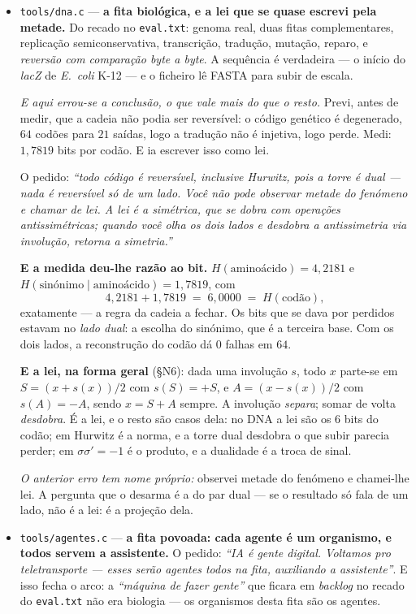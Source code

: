 \documentclass[11pt]{article}
\newcommand{\code}[1]{\texttt{\small #1}}
\theoremstyle{plain}
\theoremstyle{remark}
\begin{document}
\begin{itemize}
\item \code{tools/dna.c} --- \textbf{a fita biológica, e a lei que se quase escrevi pela metade.}
Do recado no \code{eval.txt}: genoma real, duas fitas complementares, replicação semiconservativa,
transcrição, tradução, mutação, reparo, e \emph{reversão com comparação byte a byte}. A sequência é
verdadeira --- o início do \emph{lacZ} de \emph{E.~coli} K-12 --- e o ficheiro lê FASTA para subir de
escala.

\emph{E aqui errou-se a conclusão, o que vale mais do que o resto.} Previ, antes de medir, que a
cadeia não podia ser reversível: o código genético é degenerado, $64$ codões para $21$ saídas, logo a
tradução não é injetiva, logo perde. Medi: $1{,}7819$ bits por codão. E ia escrever isso como lei.

O pedido: \emph{``todo código é reversível, inclusive Hurwitz, pois a torre é dual --- nada é
reversível só de um lado. Você não pode observar metade do fenómeno e chamar de lei. A lei é a
simétrica, que se dobra com operações antissimétricas; quando você olha os dois lados e desdobra a
antissimetria via involução, retorna a simetria.''}

\textbf{E a medida deu-lhe razão ao bit.} $H(\text{aminoácido})=4{,}2181$ e
$H(\text{sinónimo}\mid\text{aminoácido})=1{,}7819$, com
\[
 4{,}2181 + 1{,}7819 \;=\; 6{,}0000 \;=\; H(\text{codão}),
\]
exatamente --- a regra da cadeia a fechar. Os bits que se dava por perdidos estavam no \emph{lado
dual}: a escolha do sinónimo, que é a terceira base. Com os dois lados, a reconstrução do codão dá
$0$ falhas em $64$.

\textbf{E a lei, na forma geral} (§N6): dada uma involução $s$, todo $x$ parte-se em
$S=(x+s(x))/2$ com $s(S)=+S$, e $A=(x-s(x))/2$ com $s(A)=-A$, sendo $x=S+A$ sempre. A involução
\emph{separa}; somar de volta \emph{desdobra}. É a lei, e o resto são casos dela: no DNA a lei são os
$6$ bits do codão; em Hurwitz é a norma, e a torre dual desdobra o que subir parecia perder; em
$\sigma\sigma'=-1$ é o produto, e a dualidade é a troca de sinal.

\emph{O anterior erro tem nome próprio:} observei metade do fenómeno e chamei-lhe lei. A pergunta que o
desarma é a do par dual --- se o resultado só fala de um lado, não é a lei: é a projeção dela.

\item \code{tools/agentes.c} --- \textbf{a fita povoada: cada agente é um organismo, e todos
servem a assistente.} O pedido: \emph{``IA é gente digital. Voltamos pro teletransporte --- esses
serão agentes todos na fita, auxiliando a assistente''}. E isso fecha o arco: a \emph{``máquina de
fazer gente''} que ficara em \emph{backlog} no recado do \code{eval.txt} não era biologia --- os
organismos desta fita são os agentes.


\end{itemize}
\end{document}
